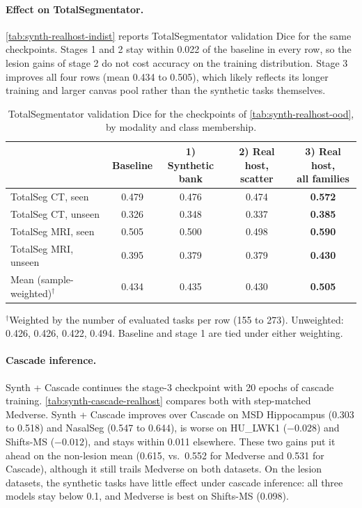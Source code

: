 \documentclass[hidelinks, a4paper, 12pt, ngerman, english]{article}  %
\begin{document}
\paragraph{Effect on TotalSegmentator.}
\autoref{tab:synth-realhost-indist} reports TotalSegmentator validation Dice
for the same checkpoints. Stages 1 and 2 stay within 0.022 of the baseline in
every row, so the lesion gains of stage 2 do not cost accuracy on the training
distribution. Stage 3 improves all four rows (mean 0.434 to 0.505), which
likely reflects its longer training and larger canvas pool rather than the
synthetic tasks themselves.


\begin{table}[t]
  \centering
  \small
  \caption{TotalSegmentator validation Dice for the checkpoints of
  \autoref{tab:synth-realhost-ood}, by modality and class membership.}
  \label{tab:synth-realhost-indist}
  \begin{tabular}{@{}lcccc@{}}
    \toprule
     & Baseline & \makecell{1) Synthetic\\bank} & \makecell{2) Real host,\\scatter} & \makecell{3) Real host,\\all families} \\
    \midrule
    TotalSeg CT, seen      & 0.479 & 0.476 & 0.474 & \textbf{0.572} \\
    TotalSeg CT, unseen    & 0.326 & 0.348 & 0.337 & \textbf{0.385} \\
    TotalSeg MRI, seen     & 0.505 & 0.500 & 0.498 & \textbf{0.590} \\
    TotalSeg MRI, unseen   & 0.395 & 0.379 & 0.379 & \textbf{0.430} \\
    \midrule
    Mean (sample-weighted)$^{\dagger}$ & 0.434 & 0.435 & 0.430 & \textbf{0.505} \\
    \bottomrule
  \end{tabular}
  \par\vspace{0.5em}
  \raggedright\footnotesize
  $^{\dagger}$Weighted by the number of evaluated tasks per row (155 to 273).
  Unweighted: 0.426, 0.426, 0.422, 0.494. Baseline and stage 1 are tied under
  either weighting.
\end{table}

\paragraph{Cascade inference.}
Synth + Cascade continues the stage-3 checkpoint with 20 epochs of cascade
training.
\autoref{tab:synth-cascade-realhost} compares both with step-matched Medverse.
Synth + Cascade improves over Cascade on MSD Hippocampus (0.303 to 0.518) and
NasalSeg (0.547 to 0.644), is worse on HU\_LWK1 ($-0.028$) and Shifts-MS
($-0.012$), and stays within 0.011 elsewhere. These two gains put it ahead on
the non-lesion mean (0.615, vs.\ 0.552 for Medverse and 0.531 for Cascade),
although it still trails Medverse on both datasets. On the lesion datasets,
the synthetic tasks have little effect under cascade inference: all three
models stay below 0.1, and Medverse is best on Shifts-MS (0.098).
\end{document}
